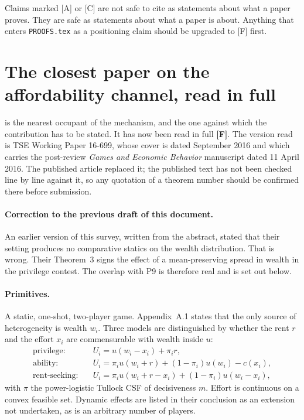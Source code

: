 \documentclass[11pt,a4paper]{article}
\begin{document}
Claims marked [A] or [C] are not safe to cite as statements about what a paper
proves. They are safe as statements about what a paper is about. Anything that
enters \texttt{PROOFS.tex} as a positioning claim should be upgraded to [F]
first.

\section{The closest paper on the affordability channel, read in full}
\label{sec:st}

\citet{SchroyenTreich2016} is the nearest occupant of the mechanism, and the
one against which the contribution has to be stated. It has now been read in
full \textbf{[F]}. The version read is TSE Working Paper 16-699, whose cover is
dated September 2016 and which carries the post-review \emph{Games and Economic
Behavior} manuscript dated 11 April 2016. The published article replaced it;
the published text has not been checked line by line against it, so any
quotation of a theorem number should be confirmed there before submission.

\paragraph{Correction to the previous draft of this document.} An earlier
version of this survey, written from the abstract, stated that their setting
produces no comparative statics on the wealth distribution. That is wrong.
Their Theorem~3 signs the effect of a mean-preserving spread in wealth in the
privilege contest. The overlap with P9 is therefore real and is set out below.

\paragraph{Primitives.} A static, one-shot, two-player game. Appendix~A.1 states
that the only source of heterogeneity is wealth $w_i$. Three models are
distinguished by whether the rent $r$ and the effort $x_i$ are commensurable
with wealth inside $u$:
\begin{align*}
  \text{privilege:} \quad & U_i = u(w_i - x_i) + \pi_i r, \\
  \text{ability:} \quad & U_i = \pi_i u(w_i + r) + (1-\pi_i) u(w_i) - c(x_i), \\
  \text{rent-seeking:} \quad & U_i = \pi_i u(w_i + r - x_i) + (1-\pi_i) u(w_i - x_i),
\end{align*}
with $\pi$ the power-logistic Tullock CSF of decisiveness $m$. Effort is
continuous on a convex feasible set. Dynamic effects are listed in their
conclusion as an extension not undertaken, as is an arbitrary number of players.
\end{document}
